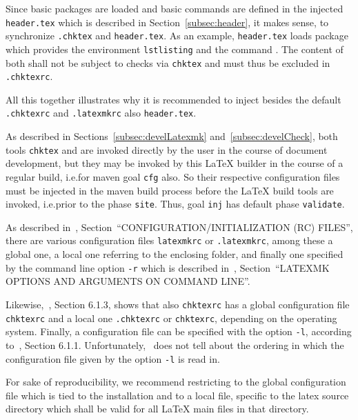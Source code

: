 Since basic packages are loaded and basic commands are defined 
in the injected \texttt{header.tex} 
which is described in Section~\ref{subsec:header}, 
it makes sense, to synchronize \texttt{.chktex} and \texttt{header.tex}. 
As an example, \texttt{header.tex} loads package  
which provides the environment \texttt{lstlisting} and the command . 
The content of both shall not be subject to checks via \texttt{chktex} 
and must thus be excluded in \texttt{.chktexrc}. 


All this together illustrates why it is recommended to inject 
besides the default \texttt{.chktexrc} and \texttt{.latexmkrc} 
also \texttt{header.tex}. 
\medskip


As described in Sections~\ref{subsec:develLatexmk} and~\ref{subsec:develCheck}, 
both tools \texttt{chktex} and  
are invoked directly by the user in the course of document development, 
but they may be invoked by this \LaTeX{} builder in the course of a regular build, 
i.e.\@ for maven goal \texttt{cfg} also. 
So their respective configuration files must be injected 
in the maven build process before the \LaTeX{} build tools are invoked, 
i.e.\@ prior to the phase \texttt{site}. 
Thus, goal \texttt{inj} has default phase \texttt{validate}. 


As described in~\cite{LatexMk23}, 
Section~``CONFIGURATION/INITIALIZATION (RC) FILES'', 
there are various configuration files \texttt{latexmkrc} or \texttt{.latexmkrc}, 
among these a global one, a local one referring to the enclosing folder, 
and finally one specified by the command line option \texttt{-r} 
which is described in~\cite{LatexMk23}, 
Section~``LATEXMK OPTIONS AND ARGUMENTS ON COMMAND LINE''. 

Likewise,~\cite{ChkTeX22}, Section 6.1.3, shows that also \texttt{chktexrc} 
has a global configuration file \texttt{chktexrc} 
and a local one \texttt{.chktexrc} or \texttt{chktexrc}, 
depending on the operating system. 
Finally, a configuration file can be specified with the option \texttt{-l}, 
according to~\cite{ChkTeX22}, Section 6.1.1. 
Unfortunately,~\cite{ChkTeX22} does not tell about the ordering 
in which the configuration file given by the option \texttt{-l} is read in. 

For sake of reproducibility, we recommend restricting to the global configuration file 
which is tied to the installation and to a local file, specific to the latex source directory 
which shall be valid for all \LaTeX{} main files in that directory. 


